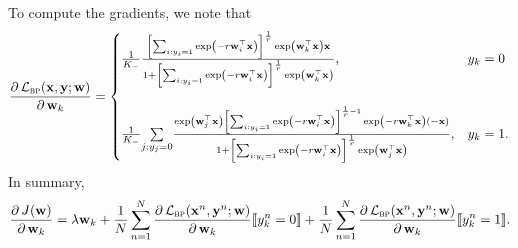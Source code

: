 \documentclass[9pt]{extarticle}
\newcommand{\llb}{\llbracket}
\newcommand{\rrb}{\rrbracket}
\newcommand{\x}{\mathbf{x}}
\newcommand{\y}{\mathbf{y}}
\newcommand{\1}{\mathbf{1}}
\newcommand{\w}{\mathbf{w}}
\newcommand{\LCal}{\mathcal{L}}
\begin{document}
To compute the gradients, we note that
$$
\frac{\partial \, \LCal_\textsc{bp}(\x, \y; \w)} {\partial \, \w_k} 
= \begin{cases}
  \frac{1}{K_-} 
  \frac{\left[ \sum_{i:y_i=1} \exp \left( -r \w_i^\top \x \right) \right]^\frac{1}{r} \exp \left( \w_k^\top \x \right) \x}
       {1 + \left[ \sum_{i:y_i=1} \exp \left( -r \w_i^\top \x \right) \right]^\frac{1}{r} \exp \left( \w_k^\top \x \right)}, & y_k = 0 \\ \\
  \frac{1}{K_-} \underset{j:y_j=0}{\sum}
  \frac{\exp \left( \w_j^\top \x \right) 
        \left[ \sum_{i:y_i=1} \exp \left( -r \w_i^\top \x \right) \right]^{\frac{1}{r}-1}
        \exp \left( -r \w_k^\top \x \right) (-\x) }
       {1 + \left[ \sum_{i:y_i=1} \exp \left( -r \w_i^\top \x \right) \right]^\frac{1}{r} \exp \left( \w_j^\top \x \right)}, & y_k = 1.
  \end{cases}
$$
In summary,
$$
\frac{\partial \, J(\w)} {\partial \, \w_k}
=\lambda \w_k + 
 \frac{1}{N} \sum_{n=1}^N
 \frac{\partial \, \LCal_\textsc{bp}(\x^n, \y^n; \w)} {\partial \, \w_k} \llb y_k^n = 0 \rrb + 
 \frac{1}{N} \sum_{n=1}^N
 \frac{\partial \, \LCal_\textsc{bp}(\x^n, \y^n; \w)} {\partial \, \w_k} \llb y_k^n = 1 \rrb.
$$





%

%

%

%

%



%
%


\end{document}
